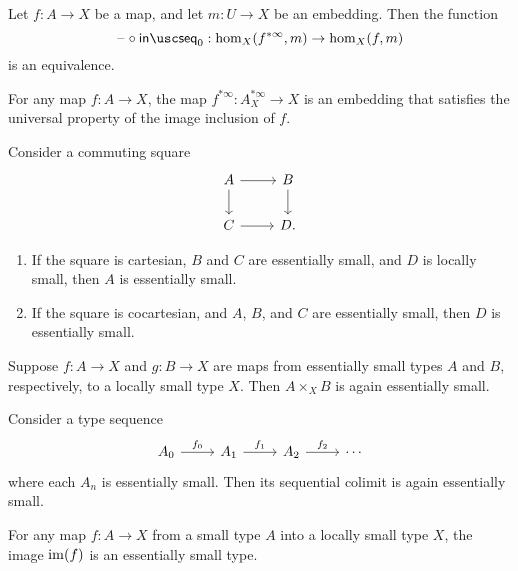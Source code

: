 \begin{lem}\label{lem:finfjp_up}
Let $f:A\to X$ be a map, and let $m:U\to X$ be an embedding. Then the function
\begin{equation*}
\blank\circ \seqin_0: \mathrm{hom}_X(f^{\ast\infty},m)\to \mathrm{hom}_X(f,m)
\end{equation*}
is an equivalence. 
\end{lem}

\begin{thm}\label{lem:isprop_infjp}
For any map $f:A\to X$, the map $f^{\ast\infty}:A_X^{\ast\infty}\to X$ is an embedding that satisfies the universal property of the image inclusion of $f$.
\end{thm}

\begin{lem}
Consider a commuting square
\begin{equation*}
\begin{tikzcd}
A \arrow[r] \arrow[d] & B \arrow[d] \\
C \arrow[r] & D.
\end{tikzcd}
\end{equation*}
\begin{enumerate}
\item If the square is cartesian, $B$ and $C$ are essentially small, and $D$ is locally small, then $A$ is essentially small.
\item If the square is cocartesian, and $A$, $B$, and $C$ are essentially small, then $D$ is essentially small. 
\end{enumerate}
\end{lem}

\begin{cor}
Suppose $f:A\to X$ and $g:B\to X$ are maps from essentially small types $A$ and $B$, respectively, to a locally small type $X$. Then $A\times_X B$ is again essentially small. 
\end{cor}

\begin{lem}
Consider a type sequence
\begin{equation*}
\begin{tikzcd}
A_0 \arrow[r,"f_0"] & A_1 \arrow[r,"f_1"] & A_2 \arrow[r,"f_2"] & \cdots
\end{tikzcd}
\end{equation*}
where each $A_n$ is essentially small. Then its sequential colimit is again essentially small. 
\end{lem}

\begin{thm}
For any map $f:A\to X$ from a small type $A$ into a locally small type $X$, the image $\operatorname{im}(f)$ is an essentially small type.
\end{thm}

